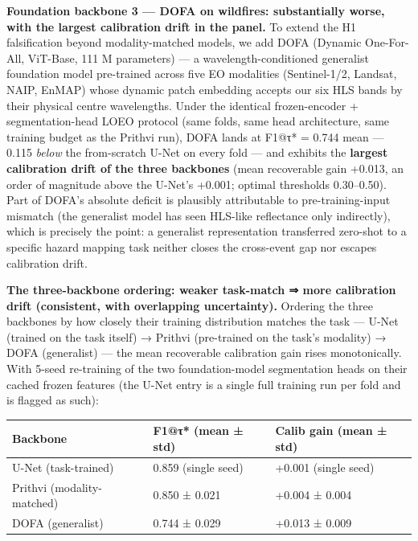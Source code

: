 \textbf{Foundation backbone 3 --- DOFA on wildfires: substantially worse, with
the largest calibration drift in the panel.} To extend the H1
falsification beyond modality-matched models, we add DOFA (Dynamic
One-For-All, ViT-Base, 111 M parameters) --- a wavelength-conditioned
generalist foundation model pre-trained across five EO modalities
(Sentinel-1/2, Landsat, NAIP, EnMAP) whose dynamic patch embedding
accepts our six HLS bands by their physical centre wavelengths. Under
the identical frozen-encoder + segmentation-head LOEO protocol (same
folds, same head architecture, same training budget as the Prithvi
run), DOFA lands at F1@τ* = 0.744 mean --- 0.115 \emph{below} the
from-scratch U-Net on every fold --- and exhibits the \textbf{largest
calibration drift of the three backbones} (mean recoverable gain
+0.013, an order of magnitude above the U-Net's +0.001; optimal
thresholds 0.30--0.50). Part of DOFA's absolute deficit is plausibly
attributable to pre-training-input mismatch (the generalist model has
seen HLS-like reflectance only indirectly), which is precisely the
point: a generalist representation transferred zero-shot to a specific
hazard mapping task neither closes the cross-event gap nor escapes
calibration drift.

\textbf{The three-backbone ordering: weaker task-match ⇒ more calibration
drift (consistent, with overlapping uncertainty).} Ordering the three
backbones by how closely their training distribution matches the task ---
U-Net (trained on the task itself) → Prithvi (pre-trained on the task's
modality) → DOFA (generalist) --- the mean recoverable calibration gain
rises monotonically. With 5-seed re-training of the two foundation-model
segmentation heads on their cached frozen features (the U-Net entry is
a single full training run per fold and is flagged as such):

\begin{longtable}[]{@{}lll@{}}
\toprule\noalign{}
Backbone & F1@τ* (mean ± std) & Calib gain (mean ± std) \\
\midrule\noalign{}
\endhead
\bottomrule\noalign{}
\endlastfoot
U-Net (task-trained) & 0.859 (single seed) & +0.001 (single seed) \\
Prithvi (modality-matched) & 0.850 ± 0.021 & +0.004 ± 0.004 \\
DOFA (generalist) & 0.744 ± 0.029 & +0.013 ± 0.009 \\
\end{longtable}

